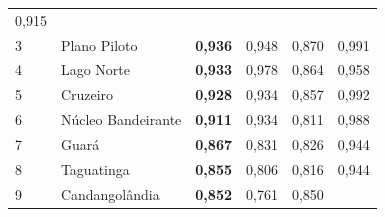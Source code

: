 \begin{center}
\begin{table}[]
{\begin{tabular}{llllll}
                {\color[HTML]{202122} 0,915} \\
                \rowcolor[HTML]{F8F9FA}
                {\color[HTML]{202122} 3} &
                {\color[HTML]{202122} Plano Piloto} &
                {\color[HTML]{202122} \textbf{0,936}} &
                {\color[HTML]{202122} 0,948} &
                {\color[HTML]{202122} 0,870} &
                {\color[HTML]{202122} 0,991} \\
                \rowcolor[HTML]{F8F9FA}
                {\color[HTML]{202122} 4} &
                {\color[HTML]{202122} Lago Norte} &
                {\color[HTML]{202122} \textbf{0,933}} &
                {\color[HTML]{202122} 0,978} &
                {\color[HTML]{202122} 0,864} &
                {\color[HTML]{202122} 0,958} \\
                \rowcolor[HTML]{F8F9FA}
                {\color[HTML]{202122} 5} &
                {\color[HTML]{202122} Cruzeiro} &
                {\color[HTML]{202122} \textbf{0,928}} &
                {\color[HTML]{202122} 0,934} &
                {\color[HTML]{202122} 0,857} &
                {\color[HTML]{202122} 0,992} \\
                \rowcolor[HTML]{F8F9FA}
                {\color[HTML]{202122} 6} &
                {\color[HTML]{202122} Núcleo Bandeirante} &
                {\color[HTML]{202122} \textbf{0,911}} &
                {\color[HTML]{202122} 0,934} &
                {\color[HTML]{202122} 0,811} &
                {\color[HTML]{202122} 0,988} \\
                \rowcolor[HTML]{F8F9FA}
                {\color[HTML]{202122} 7} &
                {\color[HTML]{202122} Guará} &
                {\color[HTML]{202122} \textbf{0,867}} &
                {\color[HTML]{202122} 0,831} &
                {\color[HTML]{202122} 0,826} &
                {\color[HTML]{202122} 0,944} \\
                \rowcolor[HTML]{F8F9FA}
                {\color[HTML]{202122} 8} &
                {\color[HTML]{202122} Taguatinga} &
                {\color[HTML]{202122} \textbf{0,855}} &
                {\color[HTML]{202122} 0,806} &
                {\color[HTML]{202122} 0,816} &
                {\color[HTML]{202122} 0,944} \\
                \rowcolor[HTML]{F8F9FA}
                {\color[HTML]{202122} 9} &
                {\color[HTML]{202122} Candangolândia} &
                {\color[HTML]{202122} \textbf{0,852}} &
                {\color[HTML]{202122} 0,761} &
                {\color[HTML]{202122} 0,850} &

\end{tabular}}
\end{table}
\end{center}

